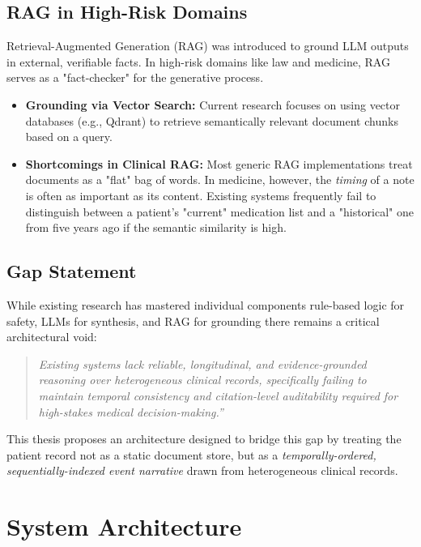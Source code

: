 \subsection{RAG in High-Risk Domains} Retrieval-Augmented Generation (RAG) was introduced to ground LLM outputs in external, verifiable facts. In high-risk domains like law and medicine, RAG serves as a "fact-checker" for the generative process. \begin{itemize} \item \textbf{Grounding via Vector Search:} Current research focuses on using vector databases (e.g., Qdrant) to retrieve semantically relevant document chunks based on a query. \item \textbf{Shortcomings in Clinical RAG:} Most generic RAG implementations treat documents as a "flat" bag of words. In medicine, however, the \textit{timing} of a note is often as important as its content. Existing systems frequently fail to distinguish between a patient's "current" medication list and a "historical" one from five years ago if the semantic similarity is high. \end{itemize}

\subsection{Gap Statement} While existing research has mastered individual components rule-based logic for safety, LLMs for synthesis, and RAG for grounding there remains a critical architectural void: \begin{quote} \textit{Existing systems lack reliable, longitudinal, and evidence-grounded reasoning over heterogeneous clinical records, specifically failing to maintain temporal consistency and citation-level auditability required for high-stakes medical decision-making.''} \end{quote} This thesis proposes an architecture designed to bridge this gap by treating the patient record not as a static document store, but as a \textit{temporally-ordered, sequentially-indexed event narrative} drawn from heterogeneous clinical records.

\section{System Architecture}
\label{sec:architecture}
